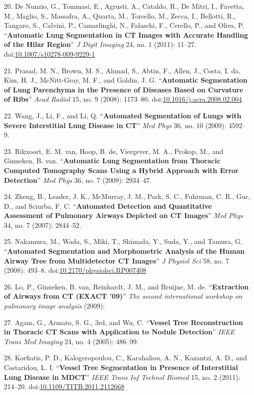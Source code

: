 \documentclass[11pt,]{article}
\begin{document}
20. De Nunzio, G., Tommasi, E., Agrusti, A., Cataldo, R., De Mitri, I.,
Favetta, M., Maglio, S., Massafra, A., Quarta, M., Torsello, M., Zecca,
I., Bellotti, R., Tangaro, S., Calvini, P., Camarlinghi, N., Falaschi,
F., Cerello, P., and Oliva, P. ``\textbf{Automatic Lung Segmentation in
CT Images with Accurate Handling of the Hilar Region}'' \emph{J Digit
Imaging} 24, no. 1 (2011): 11--27.
doi:\href{http://dx.doi.org/10.1007/s10278-009-9229-1}{10.1007/s10278-009-9229-1}

21. Prasad, M. N., Brown, M. S., Ahmad, S., Abtin, F., Allen, J., Costa,
I. da, Kim, H. J., McNitt-Gray, M. F., and Goldin, J. G.
``\textbf{Automatic Segmentation of Lung Parenchyma in the Presence of
Diseases Based on Curvature of Ribs}'' \emph{Acad Radiol} 15, no. 9
(2008): 1173--80.
doi:\href{http://dx.doi.org/10.1016/j.acra.2008.02.004}{10.1016/j.acra.2008.02.004}

22. Wang, J., Li, F., and Li, Q. ``\textbf{Automated Segmentation of
Lungs with Severe Interstitial Lung Disease in CT}'' \emph{Med Phys} 36,
no. 10 (2009): 4592--9.

23. Rikxoort, E. M. van, Hoop, B. de, Viergever, M. A., Prokop, M., and
Ginneken, B. van. ``\textbf{Automatic Lung Segmentation from Thoracic
Computed Tomography Scans Using a Hybrid Approach with Error
Detection}'' \emph{Med Phys} 36, no. 7 (2009): 2934--47.

24. Zheng, B., Leader, J. K., McMurray, J. M., Park, S. C., Fuhrman, C.
R., Gur, D., and Sciurba, F. C. ``\textbf{Automated Detection and
Quantitative Assessment of Pulmonary Airways Depicted on CT Images}''
\emph{Med Phys} 34, no. 7 (2007): 2844--52.

25. Nakamura, M., Wada, S., Miki, T., Shimada, Y., Suda, Y., and Tamura,
G. ``\textbf{Automated Segmentation and Morphometric Analysis of the
Human Airway Tree from Multidetector CT Images}'' \emph{J Physiol Sci}
58, no. 7 (2008): 493--8.
doi:\href{http://dx.doi.org/10.2170/physiolsci.RP007408}{10.2170/physiolsci.RP007408}

26. Lo, P., Ginneken, B. van, Reinhardt, J. M., and Bruijne, M. de.
``\textbf{Extraction of Airways from CT (EXACT '09)}'' \emph{The second
international workshop on pulmonary image analysis} (2009):

27. Agam, G., Armato, S. G., 3rd, and Wu, C. ``\textbf{Vessel Tree
Reconstruction in Thoracic CT Scans with Application to Nodule
Detection}'' \emph{IEEE Trans Med Imaging} 24, no. 4 (2005): 486--99.

28. Korfiatis, P. D., Kalogeropoulou, C., Karahaliou, A. N., Kazantzi,
A. D., and Costaridou, L. I. ``\textbf{Vessel Tree Segmentation in
Presence of Interstitial Lung Disease in MDCT}'' \emph{IEEE Trans Inf
Technol Biomed} 15, no. 2 (2011): 214--20.
doi:\href{http://dx.doi.org/10.1109/TITB.2011.2112668}{10.1109/TITB.2011.2112668}
\end{document}
